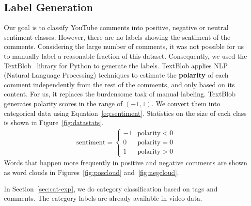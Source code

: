 \subsection{Label Generation}
\label{sec:label}
Our goal is to classify YouTube comments into positive, negative or neutral sentiment classes. However, there are no labels showing the sentiment of the comments. Considering the large number of comments, it was not possible for us to manually label a reasonable fraction of this dataset. Consequently, we used the TextBlob~\cite{textblob} library for Python to generate the labels. TextBlob applies NLP (Natural Language Processing) techniques to estimate the \textbf{polarity} of each comment independently from the rest of the comments, and only based on its content. For us, it replaces the burdensome task of manual labeling. TextBlob generates polarity scores in the range of $(-1,1)$. We convert them into categorical data using Equation~\ref{eq:sentiment}. Statistics on the size of each class is shown in Figure~\ref{fig:datastats}.
\begin{eqnarray}
\textrm{sentiment}=
\begin{cases}
-1 & \textrm{polarity} < 0\\
0 & \textrm{polarity} = 0\\
1 & \textrm{polarity} > 0
\end{cases}
\label{eq:sentiment}
\end{eqnarray}
Words that happen more frequently in positive and negative comments are shown as word clouds in Figures~\ref{fig:poscloud} and~\ref{fig:negcloud}.

In Section~\ref{sec:cat-exp}, we do category classification based on tags and comments. The category labels are already available in video data.

